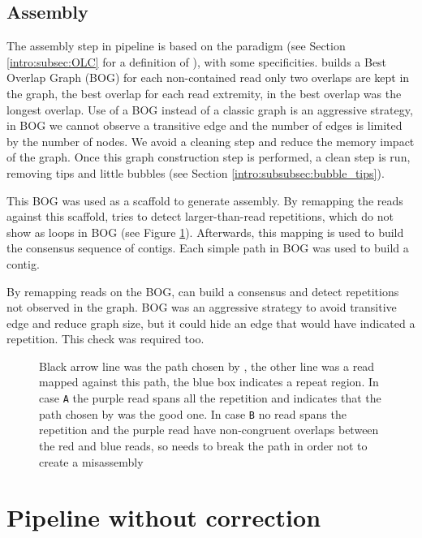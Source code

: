 \documentclass[main]{subfiles}
\begin{document}
\subsection{Assembly}

The assembly step in \canu pipeline is based on the \OLC paradigm (see Section \ref{intro:subsec:OLC} for a definition of \OLC), with some specificities. \canu builds a Best Overlap Graph (BOG) for each non-contained read only two overlaps are kept in the graph, the best overlap for each read extremity, in \canu the best overlap was the longest overlap. Use of a BOG instead of a classic \OLC graph is an aggressive strategy, in BOG we cannot observe a transitive edge and the number of edges is limited by the number of nodes. We avoid a cleaning step and reduce the memory impact of the graph. Once this graph construction step is performed, a clean step is run, removing tips and little bubbles (see Section \ref{intro:subsubsec:bubble_tips}).

This BOG was used as a scaffold to generate assembly. By remapping the reads against this scaffold, \canu tries to detect larger-than-read repetitions, which do not show as loops in BOG (see Figure \ref{sota:fig:canu:remapping}). Afterwards, this mapping is used to build the consensus sequence of contigs. Each simple path in BOG was used to build a contig.

By remapping reads on the BOG, \canu can build a consensus and detect repetitions not observed in the graph. BOG was an aggressive strategy to avoid transitive edge and reduce graph size, but it could hide an edge that would have indicated a repetition. This check was required too.

\begin{figure}[ht]
    \centering
    
    \caption{Black arrow line was the path chosen by \canu, the other line was a read mapped against this path, the blue box indicates a repeat region. In case \texttt{A} the purple read spans all the repetition and indicates that the path chosen by \canu was the good one. In case \texttt{B} no read spans the repetition and the purple read have non-congruent overlaps between the red and blue reads, so \canu needs to break the path in order not to create a misassembly}
    \label{sota:fig:canu:remapping}
\end{figure}

\section{Pipeline without correction \miniasm} \label{section:sota:miniasm}
\end{document}
